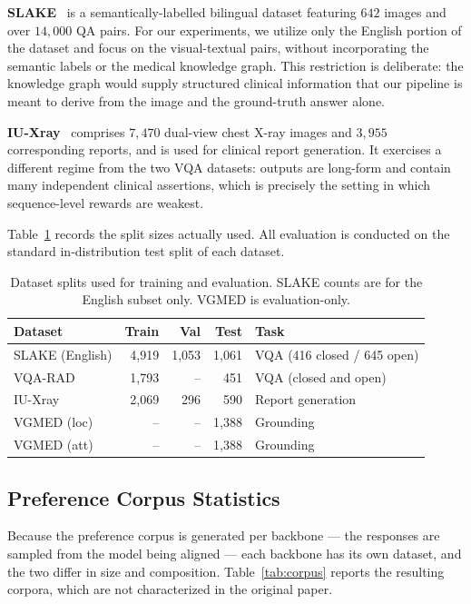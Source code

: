 \textbf{SLAKE}~\cite{liu2021slake} is a semantically-labelled bilingual dataset featuring $642$ images and over $14{,}000$ QA pairs. For our experiments, we utilize only the English portion of the dataset and focus on the visual-textual pairs, without incorporating the semantic labels or the medical knowledge graph. This restriction is deliberate: the knowledge graph would supply structured clinical information that our pipeline is meant to derive from the image and the ground-truth answer alone.

\textbf{IU-Xray}~\cite{demner2016preparing} comprises $7{,}470$ dual-view chest X-ray images and $3{,}955$ corresponding reports, and is used for clinical report generation. It exercises a different regime from the two VQA datasets: outputs are long-form and contain many independent clinical assertions, which is precisely the setting in which sequence-level rewards are weakest.

Table~\ref{tab:splits} records the split sizes actually used. All evaluation is conducted on the standard in-distribution test split of each dataset.

\begin{table}[ht]
\centering
\small
\caption{Dataset splits used for training and evaluation. SLAKE counts are for the English subset only. VGMED is evaluation-only.}
\label{tab:splits}
\begin{tabular}{lrrrl}
\toprule
\textbf{Dataset} & \textbf{Train} & \textbf{Val} & \textbf{Test} & \textbf{Task} \\
\midrule
SLAKE (English)  & 4{,}919 & 1{,}053 & 1{,}061 & VQA (416 closed / 645 open) \\
VQA-RAD          & 1{,}793 & --      & 451     & VQA (closed and open) \\
IU-Xray          & 2{,}069 & 296     & 590     & Report generation \\
\midrule
VGMED (loc)      & --      & --      & 1{,}388 & Grounding \\
VGMED (att)      & --      & --      & 1{,}388 & Grounding \\
\bottomrule
\end{tabular}
\end{table}

\subsection{Preference Corpus Statistics}
\label{sec:exp:corpus}

Because the preference corpus is generated per backbone --- the responses are sampled from the model being aligned --- each backbone has its own dataset, and the two differ in size and composition. Table~\ref{tab:corpus} reports the resulting corpora, which are not characterized in the original paper.

